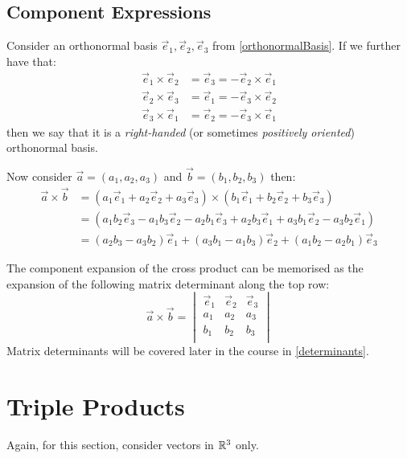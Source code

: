 \documentclass[../main.tex]{subfiles}
\begin{document}
\subsection{Component Expressions} \label{vectorProdComponents}
\begin{definition}
  Consider an orthonormal basis $\vec{e}_1, \vec{e}_2, \vec{e}_3$ from \cref{orthonormalBasis}.
  If we further have that: \label{rightHandedOrtho}
  \begin{align*}
    \vec{e}_1 \times \vec{e}_2 &= \vec{e}_3 = -\vec{e}_2 \times \vec{e}_1 \\
    \vec{e}_2 \times \vec{e}_3 &= \vec{e}_1 = -\vec{e}_3 \times \vec{e}_2 \\
    \vec{e}_3 \times \vec{e}_1 &= \vec{e}_2 = -\vec{e}_3 \times \vec{e}_1
  \end{align*}
  then we say that it is a \textit{right-handed} (or sometimes \textit{positively oriented}) orthonormal basis.
\end{definition}
Now consider $\vec{a} = (a_1, a_2, a_3)$ and $\vec{b} = (b_1, b_2, b_3)$ then:
\begin{align*}
  \vec{a} \times \vec{b} &= (a_1 \vec{e}_1 + a_2 \vec{e}_2 + a_3 \vec{e}_3) \times (b_1 \vec{e}_1 + b_2 \vec{e}_2 + b_3 \vec{e}_3) \\
                         &= (a_1 b_2 \vec{e}_3 - a_1 b_3 \vec{e}_2 - a_2 b_1 \vec{e}_3 + a_2 b_3 \vec{e}_1 + a_3 b_1 \vec{e}_2 - a_3 b_2 \vec{e}_1) \\
                         &= (a_2 b_3 - a_3 b_2) \vec{e}_1 + (a_3 b_1 - a_1 b_3) \vec{e}_2 + (a_1 b_2 - a_2 b_1) \vec{e}_3
\end{align*}
\begin{remark}
  The component expansion of the cross product can be memorised as the expansion of the following matrix determinant along the top row:
  \[
    \vec{a} \times \vec{b} = \begin{vmatrix}
    \vec{e}_1 & \vec{e}_2 & \vec{e}_3 \\
    a_1 & a_2 & a_3 \\
    b_1 & b_2 & b_3 \\
    \end{vmatrix}
  \]
  Matrix determinants will be covered later in the course in \cref{determinants}.
\end{remark}
\section{Triple Products}
\begin{remark}[Note]
  Again, for this section, consider vectors in $\mathbb{R}^{3}$ only.
\end{remark}
\end{document}
